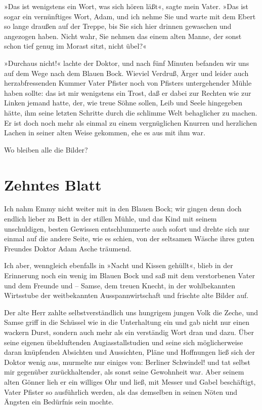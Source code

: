 »Das ist wenigstens ein Wort, was sich hören läßt«, sagte mein
Vater. »Das ist sogar ein vernünftiges Wort, Adam, und ich nehme
Sie und warte mit dem Ebert so lange draußen auf der Treppe, bis
Sie sich hier drinnen gewaschen und angezogen haben. Nicht wahr,
Sie nehmen das einem alten Manne, der sonst schon tief genug im
Morast sitzt, nicht übel?«

»Durchaus nicht!« lachte der Doktor, und nach fünf Minuten befanden
wir uns auf dem Wege nach dem Blauen Bock. Wieviel Verdruß, Ärger
und leider auch herzabfressenden Kummer Vater Pfister noch von
Pfisters untergehender Mühle haben sollte: das ist mir wenigstens
ein Trost, daß er dabei zur Rechten wie zur Linken jemand hatte,
der, wie treue Söhne sollen, Leib und Seele hingegeben hätte, ihm
seine letzten Schritte durch die schlimme Welt behaglicher zu
machen. Er ist doch noch mehr als einmal zu einem vergnüglichen
Knurren und herzlichen Lachen in seiner alten Weise gekommen, ehe
es aus mit ihm war.

Wo bleiben alle die Bilder?

\section{Zehntes Blatt}

Ich nahm Emmy nicht weiter mit in den Blauen Bock; wir gingen denn
doch endlich lieber zu Bett in der stillen Mühle, und das Kind mit
seinem unschuldigen, besten Gewissen entschlummerte auch sofort und
drehte sich nur einmal auf die andere Seite, wie es schien, von der
seltsamen Wäsche ihres guten Freundes Doktor Adam Asche träumend.

Ich aber, wenngleich ebenfalls in »Nacht und Kissen gehüllt«, blieb
in der Erinnerung noch ein wenig im Blauen Bock und saß mit dem
verstorbenen Vater und dem Freunde und – Samse, dem treuen Knecht,
in der wohlbekannten Wirtsstube der weitbekannten
Ausspannwirtschaft und frischte alte Bilder auf.

Der alte Herr zahlte selbstverständlich uns hungrigem jungen Volk
die Zeche, und Samse griff in die Schüssel wie in die Unterhaltung
ein und gab nicht nur einen wackern Durst, sondern auch mehr als
ein verständig Wort dran und dazu. Über seine eigenen übelduftenden
Augiasstallstudien und seine sich möglicherweise daran knüpfenden
Absichten und Aussichten, Pläne und Hoffnungen ließ sich der Doktor
wenig aus, murmelte nur einiges von: Berliner Schwindel! und tat
selbst mir gegenüber zurückhaltender, als sonst seine Gewohnheit
war. Aber seinem alten Gönner lieh er ein williges Ohr und ließ,
mit Messer und Gabel beschäftigt, Vater Pfister so ausführlich
werden, als das demselben in seinen Nöten und Ängsten ein Bedürfnis
sein mochte.

